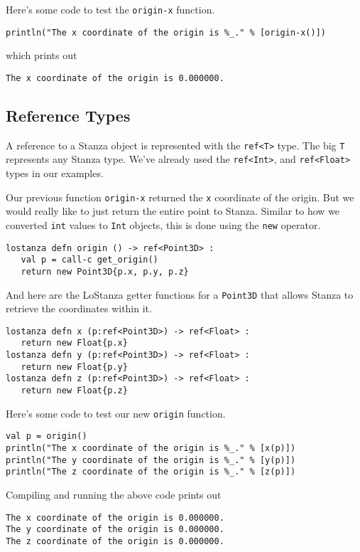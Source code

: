 \documentclass[10pt,oneside]{book}
\begin{document}
Here's some code to test the \texttt{\frenchspacing origin-x} function.
\begin{lstlisting}
println("The x coordinate of the origin is %_." % [origin-x()])
\end{lstlisting}
which prints out
\begin{lstlisting}
The x coordinate of the origin is 0.000000.
\end{lstlisting}

\subsection*{Reference Types}
A reference to a Stanza object is represented with the \texttt{\frenchspacing ref<T>} type. The big \texttt{\frenchspacing T} represents any Stanza type. We've already used the \texttt{\frenchspacing ref<Int>}, and \texttt{\frenchspacing ref<Float>} types in our examples. 

Our previous function \texttt{\frenchspacing origin-x} returned the \texttt{\frenchspacing x} coordinate of the origin. But we would really like to just return the entire point to Stanza. Similar to how we converted \texttt{\frenchspacing int} values to \texttt{\frenchspacing Int} objects, this is done using the \texttt{\frenchspacing new} operator.
\begin{lstlisting}
lostanza defn origin () -> ref<Point3D> :
   val p = call-c get_origin()
   return new Point3D{p.x, p.y, p.z}
\end{lstlisting}

And here are the LoStanza getter functions for a \texttt{\frenchspacing Point3D} that allows Stanza to retrieve the coordinates within it.
\begin{lstlisting}
lostanza defn x (p:ref<Point3D>) -> ref<Float> :
   return new Float{p.x}
lostanza defn y (p:ref<Point3D>) -> ref<Float> :
   return new Float{p.y}
lostanza defn z (p:ref<Point3D>) -> ref<Float> :
   return new Float{p.z}
\end{lstlisting}

Here's some code to test our new \texttt{\frenchspacing origin} function.
\begin{lstlisting}
val p = origin()
println("The x coordinate of the origin is %_." % [x(p)])
println("The y coordinate of the origin is %_." % [y(p)])
println("The z coordinate of the origin is %_." % [z(p)])
\end{lstlisting}

Compiling and running the above code prints out
\begin{lstlisting}
The x coordinate of the origin is 0.000000.
The y coordinate of the origin is 0.000000.
The z coordinate of the origin is 0.000000.
\end{lstlisting}
\end{document}
